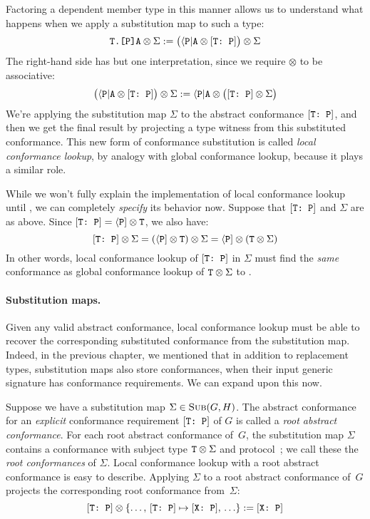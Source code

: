 \documentclass[../generics]{subfiles}
\begin{document}
Factoring a dependent member type in this manner allows us to understand what happens when we apply a substitution map to such a type:
\[\texttt{T.[P]A}\otimes\Sigma:=\bigl(\langle\texttt{P}|\texttt{A} \otimes [\texttt{T:~P}]\bigr)\otimes\Sigma\]
The right-hand side has but one interpretation, since we require $\otimes$ to be associative:
\[\bigl(\langle\texttt{P}|\texttt{A} \otimes [\texttt{T:~P}]\bigr)\otimes\Sigma := \langle\texttt{P}|\texttt{A}\otimes\bigl([\texttt{T:~P}]\otimes\Sigma\bigr)\]
We're applying the substitution map $\Sigma$ to the abstract conformance $[\texttt{T:~P}]$, and then we get the final result by projecting a type witness from this substituted conformance. This new form of conformance substitution is called \emph{local conformance lookup}, by analogy with global conformance lookup, because it plays a similar role.

While we won't fully explain the implementation of local conformance lookup until , we can completely \emph{specify} its behavior now. Suppose that $[\texttt{T:~P}]$ and $\Sigma$ are as above. Since $[\texttt{T:~P}]=\langle\texttt{P}]\otimes\texttt{T}$, we also have:
\[[\texttt{T:~P}]\otimes\Sigma=(\langle\texttt{P}]\otimes\texttt{T})\otimes\Sigma=\langle\texttt{P}]\otimes(\texttt{T}\otimes\Sigma)\]
In other words, local conformance lookup of $[\texttt{T:~P}]$ in $\Sigma$ must find the \emph{same} conformance as global conformance lookup of $\texttt{T}\otimes\Sigma$ to \tP.

\paragraph{Substitution maps.}
Given any valid abstract conformance, local conformance lookup must be able to recover the corresponding substituted conformance from the substitution map. Indeed, in the previous chapter, we mentioned that in addition to replacement types, substitution maps also store conformances, when their input generic signature has conformance requirements. We can expand upon this now.

Suppose we have a substitution map $\Sigma\in\textsc{Sub}({G, H})$. The abstract conformance for an \emph{explicit} conformance requirement $[\texttt{T:~P}]$ of $G$ is called a \emph{root abstract conformance}. For each root abstract conformance of~$G$, the substitution map $\Sigma$ contains a conformance with subject type $\texttt{T}\otimes\Sigma$ and protocol~\tP; we call these the \emph{root conformances} of $\Sigma$. Local conformance lookup with a root abstract conformance is easy to describe. Applying $\Sigma$ to a root abstract conformance of~$G$ projects the corresponding root conformance from~$\Sigma$:
\[ [\texttt{T:~P}] \otimes \{\ldots,\, [\texttt{T:~P}] \mapsto [\texttt{X:~P}],\, \ldots\} := [\texttt{X:~P}] \]
\end{document}
